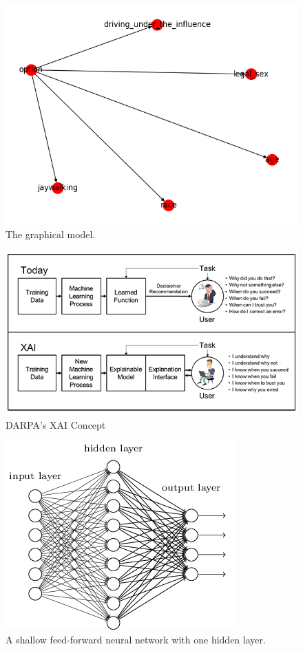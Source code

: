 \documentclass{report}
\begin{document}
\begin{figure}[h]
    \centering
    \includegraphics[scale=0.6]{figures/network.png}
    \caption[]{The graphical model.}
    \label{fig:graphical_model_image}
\end{figure}

\begin{figure}[h]
    \centering
    \includegraphics[scale=1.1]{figures/xai-figure2.png}
    \caption[]{DARPA's XAI Concept~\protect\cite{gunningXAIProgram}}
    \label{fig:darpa_xai}
\end{figure}

\begin{figure}[h]
    \centering
    \includegraphics[scale=0.6]{figures/shallow_neural_network.png}
    \caption[]{A shallow feed-forward neural network with one hidden layer.}
    \label{fig:shallow_neural_network}
\end{figure}
\end{document}
